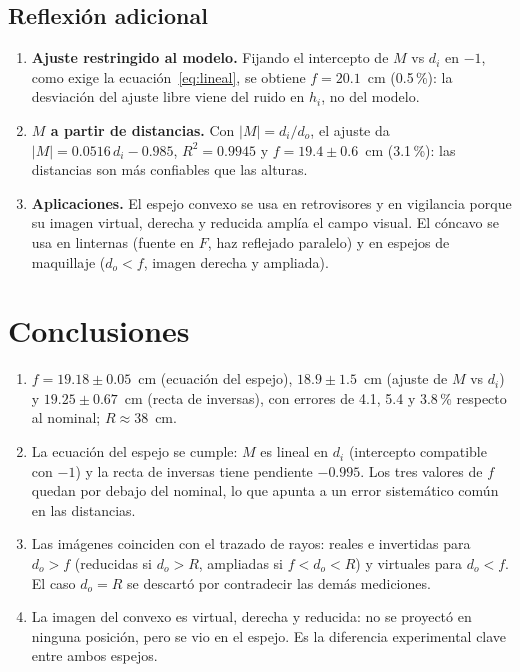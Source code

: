 \documentclass[11pt,a4paper]{article}
\begin{document}
\subsection{Reflexión adicional}
\begin{enumerate}
  \item \textbf{Ajuste restringido al modelo.} Fijando el intercepto de $M$ vs $d_i$ en $-1$, como exige la ecuación~\eqref{eq:lineal}, se obtiene $f = 20.1$~cm (0.5\,\%): la desviación del ajuste libre viene del ruido en $h_i$, no del modelo.
  \item \textbf{$M$ a partir de distancias.} Con $|M| = d_i/d_o$, el ajuste da $|M| = 0.0516\,d_i - 0.985$, $R^2 = 0.9945$ y $f = 19.4 \pm 0.6$~cm (3.1\,\%): las distancias son más confiables que las alturas.
  \item \textbf{Aplicaciones.} El espejo convexo se usa en retrovisores y en vigilancia porque su imagen virtual, derecha y reducida amplía el campo visual. El cóncavo se usa en linternas (fuente en $F$, haz reflejado paralelo) y en espejos de maquillaje ($d_o < f$, imagen derecha y ampliada).
\end{enumerate}

\section{Conclusiones}
\begin{enumerate}
  \item $f = 19.18 \pm 0.05$~cm (ecuación del espejo), $18.9 \pm 1.5$~cm (ajuste de $M$ vs $d_i$) y $19.25 \pm 0.67$~cm (recta de inversas), con errores de 4.1, 5.4 y 3.8\,\% respecto al nominal; $R \approx 38$~cm.
  \item La ecuación del espejo se cumple: $M$ es lineal en $d_i$ (intercepto compatible con $-1$) y la recta de inversas tiene pendiente $-0.995$. Los tres valores de $f$ quedan por debajo del nominal, lo que apunta a un error sistemático común en las distancias.
  \item Las imágenes coinciden con el trazado de rayos: reales e invertidas para $d_o > f$ (reducidas si $d_o > R$, ampliadas si $f < d_o < R$) y virtuales para $d_o < f$. El caso $d_o = R$ se descartó por contradecir las demás mediciones.
  \item La imagen del convexo es virtual, derecha y reducida: no se proyectó en ninguna posición, pero se vio en el espejo. Es la diferencia experimental clave entre ambos espejos.
\end{enumerate}
\end{document}
